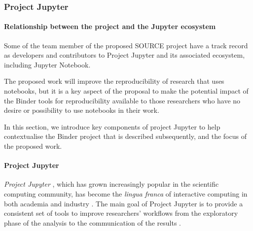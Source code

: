 \subsubsection{Project Jupyter}
\label{sec:project-jupyter}


\paragraph{Relationship between the \TheProject{} project and the Jupyter ecosystem}

Some of the team member of the proposed SOURCE project have a track record as
developers and contributors to Project Jupyter and its associated
ecosystem, including Jupyter Notebook.

The proposed work will improve the reproducibility of research that uses
notebooks, but it is a key aspect of the proposal to make the potential
impact of the Binder tools for reproducibility available to those researchers
who have no desire or possibility to use notebooks in their work.

In this section, we introduce key components of project Jupyter to help
contextualise the Binder project that is described subsequently, and the focus
of the proposed work.




\paragraph{Project Jupyter}\label{seq:project-jupyter-number-notebooks}

\emph{Project Jupyter} \cite{Jupyter}, which has grown increasingly popular in the scientific
computing community, has become the \emph{lingua franca} of interactive
computing in both academia and industry \cite{Perkel2018}. The main goal of Project Jupyter
is to provide a consistent set of tools to improve researchers'
workflows from the exploratory phase of the analysis to the communication
of the results \cite{Kluyver2016,Granger2021}.

